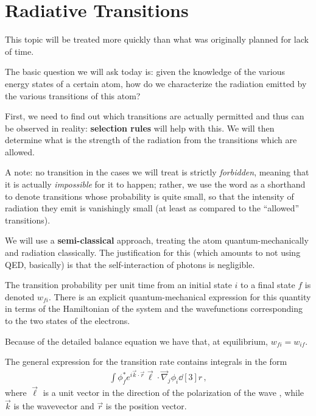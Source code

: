 \documentclass[main.tex]{subfiles}
\begin{document}
\section{Radiative Transitions}


This topic will be treated more quickly than what was originally planned for lack of time. 

The basic question we will ask today is: given the knowledge of the various energy states of a certain atom, how do we characterize the radiation emitted by the various transitions of this atom? 

First, we need to find out which transitions are actually permitted and thus can be observed in reality: \textbf{selection rules} will help with this. We will then determine what is the strength of the radiation from the transitions which are allowed. 

A note: no transition in the cases we will treat is strictly \emph{forbidden}, meaning that it is actually \emph{impossible} for it to happen; rather, we use the word as a shorthand to denote transitions whose probability is quite small, so that the intensity of radiation they emit is vanishingly small (at least as compared to the ``allowed'' transitions). 

We will use a \textbf{semi-classical} approach, treating the atom quantum-mechanically and radiation classically. 
The justification for this (which amounts to not using QED, basically) is that the self-interaction of photons is negligible. 


The transition probability per unit time from an initial state \(i\) to a final state \(f\) is denoted \(w_{fi}\).
There is an explicit quantum-mechanical expression for this quantity in terms of the Hamiltonian of the system and the wavefunctions corresponding to the two states of the electrons. 

Because of the detailed balance equation we have that, at equilibrium, \(w_{fi} = w_{if}\). 

The general expression for the transition rate contains integrals in the form 
%
\begin{align}
\int \phi _f^{*} e^{i \vec{k} \cdot \vec{r}} \vec{\ell} \cdot \vec{\nabla}_j \phi _i \dd[3]{r}
\,,
\end{align}
%
where \(\vec{\ell}\) is a unit vector in the direction of the polarization of the wave \cite[eq.\ 10.13 onwards]{rybickiRadiativeProcessesAstrophysics1979}, while \(\vec{k}\) is the wavevector and \(\vec{r}\) is the position vector.
\end{document}
